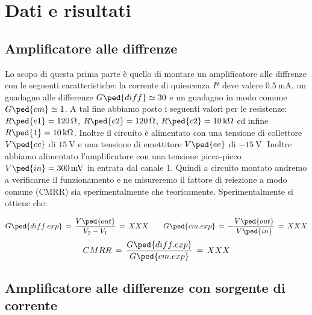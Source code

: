 \section*{Dati e risultati}

\subsection*{Amplificatore alle diffrenze}

Lo scopo di questa prima parte è quello di montare un amplificatore alle diffrenze con le seguenti caratteristiche: la corrente di quiescenza $I^q$ deve valere $\SI{0.5}{\milli\ampere}$, un guadagno alle differenze $G\ped{diff} \simeq 30$ e un guadagno in modo comune $G\ped{cm} \simeq 1$.
A tal fine abbiamo posto i seguenti valori per le resistenze: $R\ped{e1} = \SI{120}{\ohm}$, $R\ped{e2} = \SI{120}{\ohm}$, $R\ped{c2} = \SI{10}{\kilo\ohm}$ ed infine $R\ped{1} = \SI{10}{\kilo\ohm}$. Inoltre il circuito è alimentato con una tensione di collettore $V\ped{cc}$ di $\SI{15}{\volt}$ e una tensione di emettitore $V\ped{ee}$ di $\SI{-15}{\volt}$.
Inoltre abbiamo alimentato l'amplificatore con una tensione picco-picco $V\ped{in} = \SI{300}{\milli\volt}$ in entrata dal canale 1.
Quindi a circuito montato andremo a verificarne il funzionamento e ne misureremo il fattore di reiezione a modo comune (CMRR) sia sperimentalmente che teoricamente.
Sperimentalmente si ottiene che:

\begin{equation}
	G\ped{diff.exp}\,=\,\frac{V\ped{out}}{V_2-V_1}\,=\, XXX \qquad G\ped{cm.exp}\,=\,-\frac{V\ped{out}}{V\ped{in}}\,=\, XXX
\end{equation}
\begin{equation}
	CMRR\,=\,\frac{G\ped{diff.exp}}{G\ped{cm.exp}}\,=\, XXX
\end{equation}

\subsection*{Amplificatore alle differenze con sorgente di corrente}